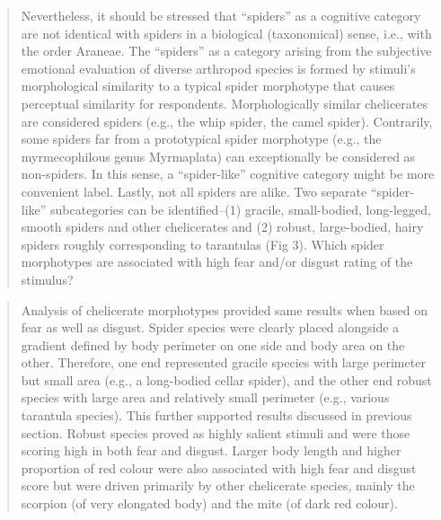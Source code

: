 \documentclass[
]{book}
\begin{document}
\begin{quote}
Nevertheless, it should be stressed that ``spiders'' as a cognitive category are not identical with spiders in a biological (taxonomical) sense, i.e., with the order Araneae. The ``spiders'' as a category arising from the subjective emotional evaluation of diverse arthropod species is formed by stimuli's morphological similarity to a typical spider morphotype that causes perceptual similarity for respondents. Morphologically similar chelicerates are considered spiders (e.g., the whip spider, the camel spider). Contrarily, some spiders far from a prototypical spider morphotype (e.g., the myrmecophilous genus Myrmaplata) can exceptionally be considered as non-spiders. In this sense, a ``spider-like'' cognitive category might be more convenient label. Lastly, not all spiders are alike. Two separate ``spider-like'' subcategories can be identified--(1) gracile, small-bodied, long-legged, smooth spiders and other chelicerates and (2) robust, large-bodied, hairy spiders roughly corresponding to tarantulas (Fig 3).
Which spider morphotypes are associated with high fear and/or disgust rating of the stimulus?
\end{quote}

\begin{quote}
Analysis of chelicerate morphotypes provided same results when based on fear as well as disgust. Spider species were clearly placed alongside a gradient defined by body perimeter on one side and body area on the other. Therefore, one end represented gracile species with large perimeter but small area (e.g., a long-bodied cellar spider), and the other end robust species with large area and relatively small perimeter (e.g., various tarantula species). This further supported results discussed in previous section. Robust species proved as highly salient stimuli and were those scoring high in both fear and disgust. Larger body length and higher proportion of red colour were also associated with high fear and disgust score but were driven primarily by other chelicerate species, mainly the scorpion (of very elongated body) and the mite (of dark red colour).
\end{quote}
\end{document}
